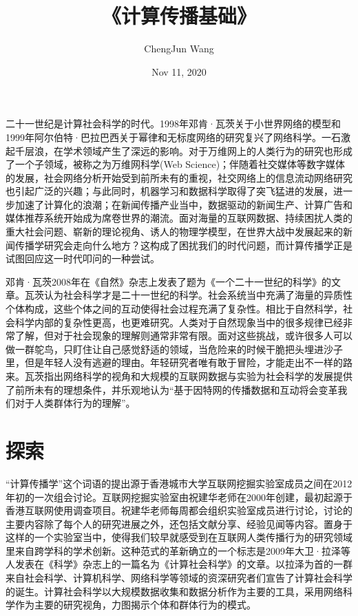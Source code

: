 \documentclass[letterpaper,10pt,english]{sphinxmanual}
\title{《计算传播基础》}
\date{Nov 11, 2020}
\author{Cheng\sphinxhyphen{}Jun Wang}
\begin{document}
\pagestyle{empty}
\sphinxmaketitle
\pagestyle{plain}
\sphinxtableofcontents
\pagestyle{normal}
\label{\detokenize{index::doc}}



二十一世纪是计算社会科学的时代。1998年邓肯·瓦茨关于小世界网络的模型和1999年阿尔伯特·巴拉巴西关于幂律和无标度网络的研究复兴了网络科学。一石激起千层浪，在学术领域产生了深远的影响。对于万维网上的人类行为的研究也形成了一个子领域，被称之为万维网科学(Web Science)；伴随着社交媒体等数字媒体的发展，社会网络分析开始受到前所未有的重视，社交网络上的信息流动网络研究也引起广泛的兴趣；与此同时，机器学习和数据科学取得了突飞猛进的发展，进一步加速了计算化的浪潮；在新闻传播产业当中，数据驱动的新闻生产、计算广告和媒体推荐系统开始成为席卷世界的潮流。面对海量的互联网数据、持续困扰人类的重大社会问题、崭新的理论视角、诱人的物理学模型，在世界大战中发展起来的新闻传播学研究会走向什么地方？这构成了困扰我们的时代问题，而计算传播学正是试图回应这一时代叩问的一种尝试。

邓肯·瓦茨2008年在《自然》杂志上发表了题为《一个二十一世纪的科学》的文章。瓦茨认为社会科学才是二十一世纪的科学。社会系统当中充满了海量的异质性个体构成，这些个体之间的互动使得社会过程充满了复杂性。相比于自然科学，社会科学内部的复杂性更高，也更难研究。人类对于自然现象当中的很多规律已经非常了解，但对于社会现象的理解则通常非常有限。面对这些挑战，或许很多人可以做一群鸵鸟，只盯住让自己感觉舒适的领域，当危险来的时候干脆把头埋进沙子里，但是年轻人没有逃避的理由。年轻研究者唯有敢于冒险，才能走出不一样的路来。瓦茨指出网络科学的视角和大规模的互联网数据与实验为社会科学的发展提供了前所未有的理想条件，并乐观地认为“基于因特网的传播数据和互动将会变革我们对于人类群体行为的理解”。


\chapter{探索}
\label{\detokenize{index:id2}}
“计算传播学”这个词语的提出源于香港城市大学互联网挖掘实验室成员之间在2012年初的一次组会讨论。互联网挖掘实验室由祝建华老师在2000年创建，最初起源于香港互联网使用调查项目。祝建华老师每周都会组织实验室成员进行讨论，讨论的主要内容除了每个人的研究进展之外，还包括文献分享、经验见闻等内容。置身于这样的一个实验室当中，使得我们较早就感受到在互联网人类传播行为的研究领域里来自跨学科的学术创新。这种范式的革新确立的一个标志是2009年大卫·拉泽等人发表在《科学》杂志上的一篇名为《计算社会科学》的文章。以拉泽为首的一群来自社会科学、计算机科学、网络科学等领域的资深研究者们宣告了计算社会科学的诞生。计算社会科学以大规模数据收集和数据分析作为主要的工具，采用网络科学作为主要的研究视角，力图揭示个体和群体行为的模式。
\end{document}
